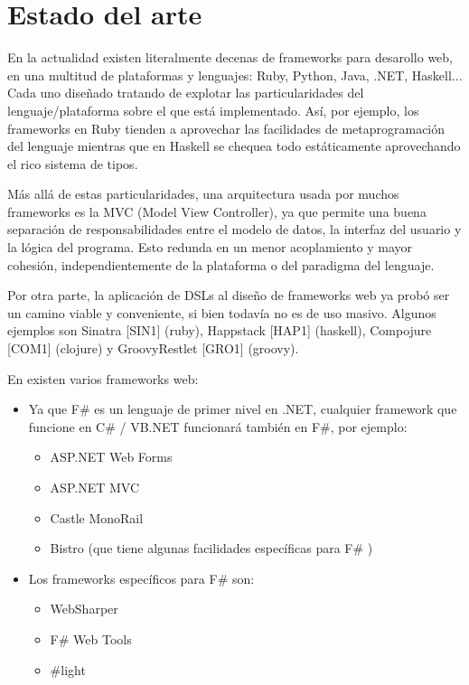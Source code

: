\documentclass[12pt]{article}
\begin{document}
\section{Estado del arte}

En la actualidad existen literalmente decenas de frameworks para desarollo web, en una multitud de plataformas y lenguajes: Ruby, Python, Java, .NET, Haskell... Cada uno diseñado tratando de explotar las particularidades del lenguaje/plataforma sobre el que está implementado. Así, por ejemplo, los frameworks en Ruby tienden a aprovechar las facilidades de metaprogramación del lenguaje mientras que en Haskell se chequea todo estáticamente aprovechando el rico sistema de tipos.

Más allá de estas particularidades, una arquitectura usada por muchos frameworks es la MVC (Model View Controller), ya que permite una buena separación de responsabilidades entre el modelo de datos, la interfaz del usuario y la lógica del programa. Esto redunda en un menor acoplamiento y mayor cohesión, independientemente de la plataforma o del paradigma del lenguaje.

Por otra parte, la aplicación de DSLs al diseño de frameworks web ya probó ser un camino viable y conveniente, si bien todavía no es de uso masivo. Algunos ejemplos son Sinatra [SIN1] (\gls{ruby}), Happstack [HAP1] (\gls{haskell}), Compojure [COM1] (\gls{clojure}) y GroovyRestlet [GRO1] (\gls{groovy}).

En  existen varios frameworks web:

\begin{itemize}
	\item Ya que F\# es un lenguaje de primer nivel en .NET, cualquier framework que funcione en C\# / VB.NET funcionará también en F\#, por ejemplo:
	\begin{itemize}
		\item ASP.NET Web Forms \cite{webforms}
		\item ASP.NET MVC \cite{mvc}
		\item Castle MonoRail \cite{monorail}
		\item Bistro \cite{bistro} (que tiene algunas facilidades específicas para F\# \cite{bistroext})
	\end{itemize}
	\item Los frameworks específicos para F\# son:
	\begin{itemize}
		\item WebSharper \cite{websharper}
		\item F\# Web Tools \cite{fswebtools}
		\item \#light \cite{sharplight}
	\end{itemize}
\end{itemize}
\end{document}

